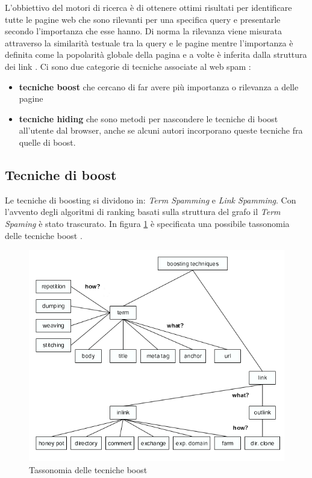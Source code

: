 L'obbiettivo del motori di ricerca è di ottenere ottimi risultati per identificare tutte le pagine web che sono rilevanti per una specifica query e presentarle secondo l'importanza che esse hanno. Di norma la rilevanza viene misurata attraverso la similarità testuale tra la query e le pagine mentre l'importanza è definita come la popolarità globale della pagina e a volte è inferita dalla struttura dei link \cite{ilprints646}. Ci sono due categorie di tecniche associate al web spam \cite{ilprints646}:
\begin{itemize}
\item \textbf{tecniche boost} che cercano di far avere più importanza o rilevanza a delle pagine
\item \textbf{tecniche hiding} che sono metodi per nascondere le tecniche di boost all'utente dal browser, anche se alcuni autori incorporano queste tecniche fra quelle di boost.
\end{itemize}

\subsection{Tecniche di boost}
Le tecniche di boosting si dividono in: \textit{Term Spamming} e \textit{Link Spamming}. Con l'avvento degli algoritmi di ranking basati sulla struttura del grafo il \textit{Term Spaming} è stato trascurato. In figura \ref{fig:tassonomiaTecnicheBoost} è specificata una possibile tassonomia delle tecniche boost \cite{ilprints646}.
\begin{figure} 
 \centering
 \includegraphics[width=12cm]{immagini/tassonomiaTecnicheBoost}
 \caption{Tassonomia delle tecniche boost}
 \label{fig:tassonomiaTecnicheBoost}
\end{figure}

